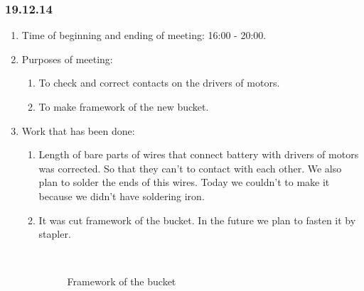 \subsubsection{19.12.14}
\begin{enumerate}
	\item Time of beginning and ending of meeting: 16:00 - 20:00.
	\item Purposes of meeting:
	\begin{enumerate}
		\item To check and correct contacts on the drivers of motors.
		
		\item To make framework of the new bucket.
		
	\end{enumerate}
	
	\item Work that has been done:
	\begin{enumerate}
		\item Length of bare parts of wires that connect battery with drivers of motors was corrected. So that they can't to contact with each other. We also plan to solder the ends of this wires. Today we couldn't to make it because we didn't have soldering iron.
		
		\item It was cut framework of the bucket. In the future we plan to fasten it by stapler. 
		\begin{figure}[H]
			\begin{minipage}[h]{0.2\linewidth}
				\center  
			\end{minipage}
			\begin{minipage}[h]{0.6\linewidth}
				\caption{Framework of the bucket}
			\end{minipage}
		\end{figure}		
		

\end{enumerate}
\end{enumerate}
